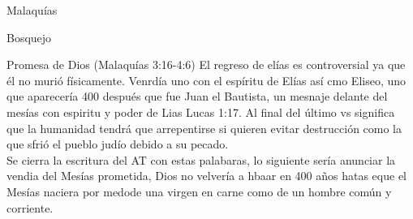 \documentclass[12pt]{article}
\begin{document}
\begin{section}{Malaquías}
\begin{subsection}{Bosquejo}
\begin{subsubsection}{Promesa de Dios (Malaquías 3:16-4:6)}
			El regreso de elías es controversial ya que él no murió físicamente. Venrdía uno con el espíritu de Elías así cmo Eliseo, uno que aparecería 400 después que fue Juan el Bautista, un mesnaje delante del mesías con espiritu y poder de Lias Lucas 1:17. Al final del último vs significa que la humanidad tendrá que arrepentirse si quieren evitar destrucción como la que sfrió el pueblo judío debido a su pecado.\\
			Se cierra la escritura del AT con estas palabaras, lo siguiente sería anunciar la vendia del Mesías prometida, Dios no velvería a hbaar en 400 años hatas eque el Mesías naciera por medode  una virgen en carne como de un hombre común y corriente.
		\end{subsubsection}
	\end{subsection}
\end{section}
\end{document}
